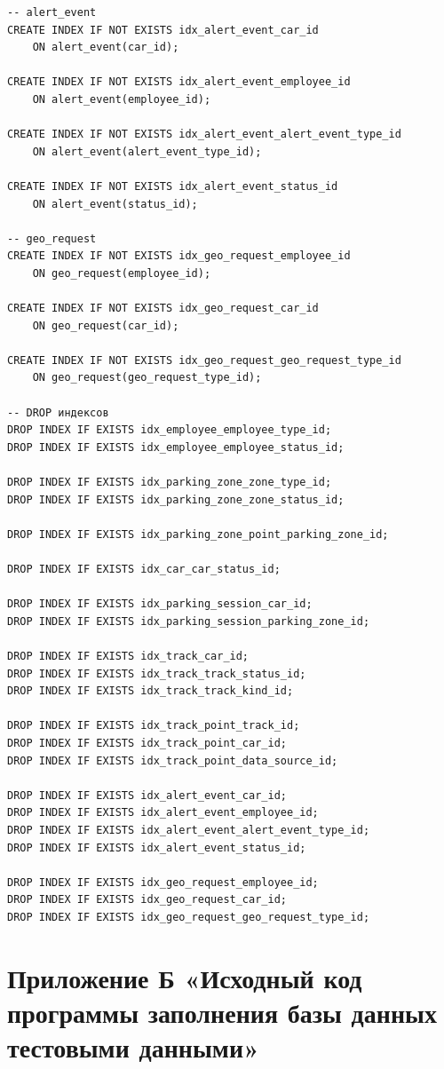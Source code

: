 \begin{lstlisting}[style=sqlstyle, caption={SQL-скрипт для создания индексов}, label={lst:schema}]
-- alert_event
CREATE INDEX IF NOT EXISTS idx_alert_event_car_id
  	ON alert_event(car_id);

CREATE INDEX IF NOT EXISTS idx_alert_event_employee_id
  	ON alert_event(employee_id);

CREATE INDEX IF NOT EXISTS idx_alert_event_alert_event_type_id
  	ON alert_event(alert_event_type_id);

CREATE INDEX IF NOT EXISTS idx_alert_event_status_id
  	ON alert_event(status_id);

-- geo_request
CREATE INDEX IF NOT EXISTS idx_geo_request_employee_id
	ON geo_request(employee_id);

CREATE INDEX IF NOT EXISTS idx_geo_request_car_id
  	ON geo_request(car_id);

CREATE INDEX IF NOT EXISTS idx_geo_request_geo_request_type_id
  	ON geo_request(geo_request_type_id);

-- DROP индексов
DROP INDEX IF EXISTS idx_employee_employee_type_id;
DROP INDEX IF EXISTS idx_employee_employee_status_id;

DROP INDEX IF EXISTS idx_parking_zone_zone_type_id;
DROP INDEX IF EXISTS idx_parking_zone_zone_status_id;

DROP INDEX IF EXISTS idx_parking_zone_point_parking_zone_id;

DROP INDEX IF EXISTS idx_car_car_status_id;

DROP INDEX IF EXISTS idx_parking_session_car_id;
DROP INDEX IF EXISTS idx_parking_session_parking_zone_id;

DROP INDEX IF EXISTS idx_track_car_id;
DROP INDEX IF EXISTS idx_track_track_status_id;
DROP INDEX IF EXISTS idx_track_track_kind_id;

DROP INDEX IF EXISTS idx_track_point_track_id;
DROP INDEX IF EXISTS idx_track_point_car_id;
DROP INDEX IF EXISTS idx_track_point_data_source_id;

DROP INDEX IF EXISTS idx_alert_event_car_id;
DROP INDEX IF EXISTS idx_alert_event_employee_id;
DROP INDEX IF EXISTS idx_alert_event_alert_event_type_id;
DROP INDEX IF EXISTS idx_alert_event_status_id;

DROP INDEX IF EXISTS idx_geo_request_employee_id;
DROP INDEX IF EXISTS idx_geo_request_car_id;
DROP INDEX IF EXISTS idx_geo_request_geo_request_type_id;
\end{lstlisting}

\newpage

\section*{Приложение Б «Исходный код программы заполнения базы данных тестовыми данными»}\label{app:B}


